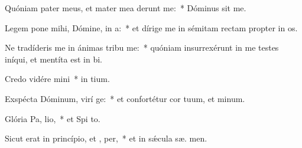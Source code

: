 \item Quóniam pater meus, et mater mea derunt me:~* Dóminus  sit me.
\item Legem pone mihi, Dómine, in  a:~* et dírige me in sémitam rectam propter in os.
\item Ne tradíderis me in ánimas tribu me:~* quóniam insurrexérunt in me testes iníqui, et mentíta est in bi.
\item Credo vidére  mini~* in  tium.
\item Exspécta Dóminum, virí ge:~* et confortétur cor tuum, et  minum.
\item Glória Pa,  lio,~* et Spi to.
\item Sicut erat in princípio, et ,  per,~* et in sǽcula sæ. men.
